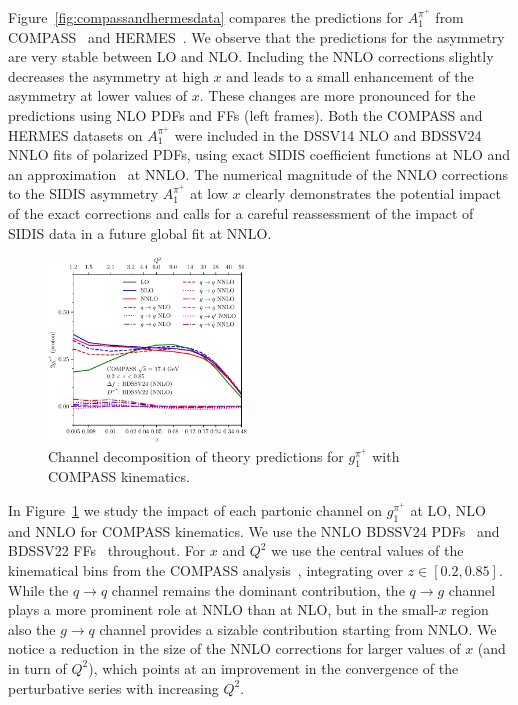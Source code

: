 \documentclass[10pt,aps,prl,twocolumn,preprintnumbers,nofootinbib]{revtex4-2}
\begin{document}
Figure~\ref{fig:compassandhermesdata} compares 
the predictions for 
$A_1^{\pi^+}$
from COMPASS~\protect\cite{COMPASS:2010hwr}  
  and HERMES~\protect\cite{HERMES:2018awh}. We 
  observe that the predictions for the asymmetry are 
  very stable between LO and NLO. Including  
  the NNLO corrections slightly decreases the 
  asymmetry at high $x$ and leads to a small enhancement 
  of the asymmetry at lower values of $x$. These changes 
  are more pronounced for the predictions using NLO PDFs and FFs (left frames). Both the COMPASS  and HERMES
  datasets on $A_1^{\pi^+}$ were included in the 
  DSSV14 NLO and BDSSV24 NNLO fits of polarized PDFs, using 
  exact SIDIS coefficient functions at NLO and an 
  approximation~\cite{Abele:2021nyo} at NNLO. 
The numerical magnitude of the NNLO corrections to the 
SIDIS asymmetry $A_1^{\pi^+}$ at low $x$ clearly demonstrates 
the potential impact of the exact corrections and calls 
for a careful reassessment of the impact of SIDIS data 
in a future global fit at NNLO. 
\begin{figure}[t]
  \includegraphics[width=0.47\textwidth]{figure2.pdf}
  \caption{Channel decomposition of theory predictions for $g_1^{\pi^+}$ with COMPASS kinematics.}
  \label{fig:compassg1h}
\end{figure}

In Figure~\ref{fig:compassg1h} we study the impact of each partonic channel on $g_1^{\pi^+}$ at LO, NLO and NNLO for COMPASS kinematics. We use the NNLO BDSSV24
PDFs~\cite{Borsa:2024mss} and BDSSV22 FFs~\cite{Borsa:2022vvp} throughout.
For $x$ and $Q^2$ we use the central values of the kinematical bins from the COMPASS analysis~\cite{COMPASS:2010hwr}, integrating over $z\in[0.2,0.85]$.
While the $q\to q$ channel remains the dominant contribution, the $q\to g$ channel plays a more prominent role at NNLO than at NLO, but in the small-$x$ region also the $g \to q$ channel provides a sizable contribution starting from NNLO.
We notice a reduction in the size of the NNLO corrections for larger values of $x$ (and in turn of $Q^2$), which points at an improvement in the convergence of the perturbative series with increasing $Q^2$. 
\end{document}
